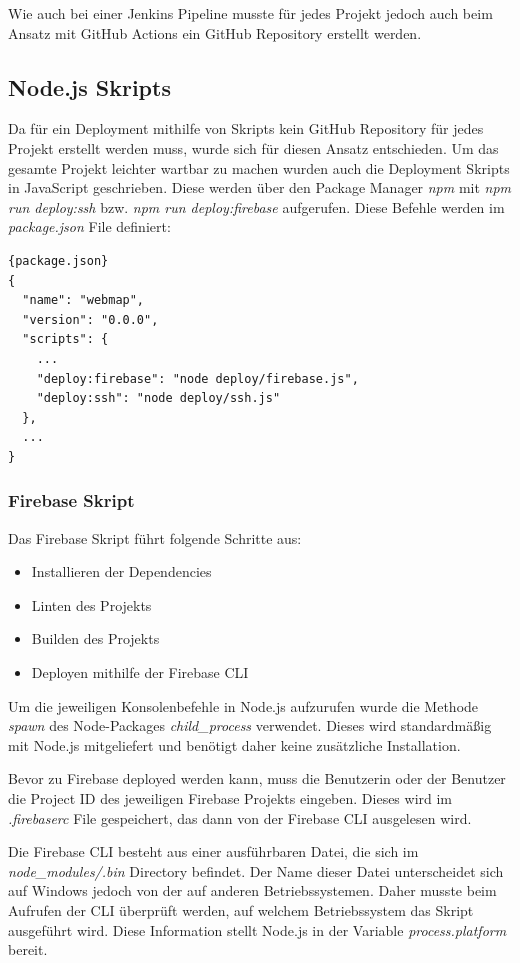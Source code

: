 Wie auch bei einer Jenkins Pipeline musste für jedes Projekt jedoch auch beim
Ansatz mit GitHub Actions ein GitHub Repository erstellt werden.

\subsection{Node.js Skripts}
Da für ein Deployment mithilfe von Skripts kein GitHub Repository für jedes Projekt erstellt werden muss,
wurde sich für diesen Ansatz entschieden.
Um das gesamte Projekt leichter wartbar zu machen wurden auch die Deployment Skripts in JavaScript geschrieben.
Diese werden über den Package Manager \textit{npm} mit \textit{npm run deploy:ssh} bzw.
\textit{npm run deploy:firebase} aufgerufen.
Diese Befehle werden im \textit{package.json} File definiert:

\begin{lstlisting}[label={lst:package.json}]{package.json}
{
  "name": "webmap",
  "version": "0.0.0",
  "scripts": {
    ...
    "deploy:firebase": "node deploy/firebase.js",
    "deploy:ssh": "node deploy/ssh.js"
  },
  ...
}
\end{lstlisting}

\subsubsection{Firebase Skript}
Das Firebase Skript führt folgende Schritte aus:

\begin{itemize}
    \item Installieren der Dependencies
    \item Linten des Projekts
    \item Builden des Projekts
    \item Deployen mithilfe der Firebase CLI
\end{itemize}

Um die jeweiligen Konsolenbefehle in Node.js aufzurufen wurde die Methode \textit{spawn} des Node-Packages
\textit{child\_process} verwendet.
Dieses wird standardmäßig mit Node.js mitgeliefert und benötigt daher keine zusätzliche Installation.

Bevor zu Firebase deployed werden kann, muss die Benutzerin oder der Benutzer die Project ID des jeweiligen
Firebase Projekts eingeben.
Dieses wird im \textit{.firebaserc} File gespeichert, das dann von der Firebase CLI ausgelesen wird.

Die Firebase CLI besteht aus einer ausführbaren Datei, die sich im \textit{node\_modules/.bin} Directory befindet.
Der Name dieser Datei unterscheidet sich auf Windows jedoch von der auf anderen Betriebssystemen.
Daher musste beim Aufrufen der CLI überprüft werden, auf welchem Betriebssystem das Skript ausgeführt wird.
Diese Information stellt Node.js in der Variable \textit{process.platform} bereit.


